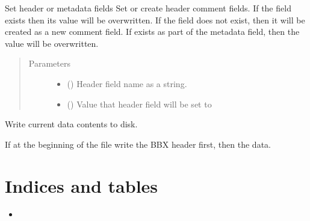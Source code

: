 \documentclass[letterpaper,10pt,english]{sphinxmanual}
\begin{document}
\begin{fulllineitems}

\begin{fulllineitems}
\label{\detokenize{index:lofasm.bbx.bbx.LofasmFile.set}}
Set header or metadata fields
Set or create header comment fields. If the field  exists
then its value will be overwritten.
If the field does not exist, then it will be created as a
new comment field.
If  exists as part of the metadata field, then the
value will be overwritten.
\begin{quote}\begin{description}
\item[{Parameters}] \leavevmode\begin{itemize}
\item {} 
 () \textendash{} Header field name as a string.

\item {} 
 (\sphinxstyleliteralemphasis{, }\sphinxstyleliteralemphasis{, }) \textendash{} Value that header field will be set to

\end{itemize}

\end{description}\end{quote}

\end{fulllineitems}


\begin{fulllineitems}
\label{\detokenize{index:lofasm.bbx.bbx.LofasmFile.write}}
Write current data contents to disk.

If at the beginning of the file write the BBX header first, then the data.

\end{fulllineitems}


\end{fulllineitems}



\chapter{Indices and tables}
\label{\detokenize{index:indices-and-tables}}\label{\detokenize{index:welcome-to-lofasm-s-documentation}}\begin{itemize}
\item {} 

\end{itemize}



\renewcommand{\indexname}{Index}
\printindex
\end{document}
